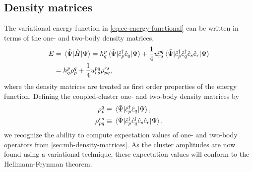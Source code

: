        \subsection{Density matrices}
            \label{subsec:cc-density-matrices}
            The variational energy function in \autoref{eq:cc-energy-functional}
            can be written in terms of the one- and two-body density matrices,
            \begin{align}
                E
                &= \mel*{\tilde{\Psi}}{\hat{H}}{\Psi}
                = h^{p}_{q}
                \mel*{\tilde{\Psi}}{\hat{c}_{p}^{\dagger}\hat{c}_{q}}{\Psi}
                + \frac{1}{4}
                u^{pq}_{rs}
                \mel*{\tilde{\Psi}}{\hat{c}_{p}^{\dagger}\hat{c}_{q}^{\dagger}\hat{c}_{s}\hat{c}_{r}}{\Psi}
                \\
                &=
                h^{p}_{q} \rho^{q}_{p}
                + \frac{1}{4}
                u^{pq}_{rs}
                \rho^{rs}_{pq},
            \end{align}
            where the density matrices are treated as first order properties of
            the energy function.
            Defining the coupled-cluster one- and two-body density matrices by
            \begin{align}
                \rho^{q}_{p}
                &\equiv \mel*{\tilde{\Psi}}{\hat{c}_{p}^{\dagger}\hat{c}_{q}}{\Psi},
                \label{eq:cc-one-body-density}
                \\
                \rho^{rs}_{pq}
                &\equiv
                \mel*{\tilde{\Psi}}{
                    \hat{c}_{p}^{\dagger}\hat{c}_{q}^{\dagger}\hat{c}_{s}\hat{c}_{r}
                }{\Psi},
                \label{eq:cc-two-body-density}
            \end{align}
            we recognize the ability to compute expectation values of one- and
            two-body operators from \autoref{sec:mb-density-matrices}.
            As the cluster amplitudes are now found using a variational
            technique, these expectation values will conform to the
            Hellmann-Feynman theorem.

